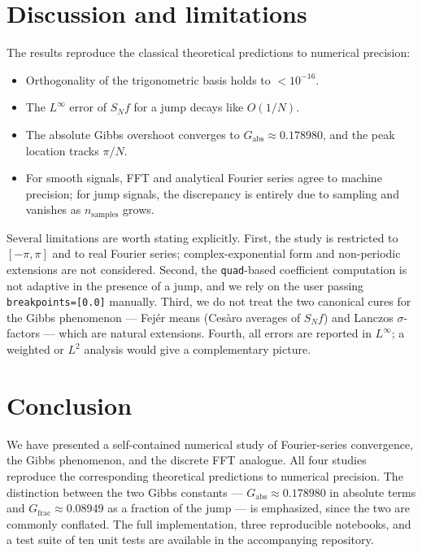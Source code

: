 \documentclass[11pt,a4paper]{article}
\begin{document}
\section{Discussion and limitations}
\label{sec:discussion}

The results reproduce the classical theoretical predictions to numerical
precision:

\begin{itemize}
    \item Orthogonality of the trigonometric basis holds to
          $<10^{-16}$.
    \item The $L^\infty$ error of $S_N f$ for a jump decays like
          $O(1/N)$.
    \item The absolute Gibbs overshoot converges to
          $G_{\text{abs}} \approx 0.178980$, and the peak location tracks
          $\pi/N$.
    \item For smooth signals, FFT and analytical Fourier series agree to
          machine precision; for jump signals, the discrepancy is entirely
          due to sampling and vanishes as $n_{\text{samples}}$ grows.
\end{itemize}

Several limitations are worth stating explicitly. First, the study is
restricted to $[-\pi, \pi]$ and to real Fourier series; complex-exponential
form and non-periodic extensions are not considered. Second, the
\texttt{quad}-based coefficient computation is not adaptive in the presence
of a jump, and we rely on the user passing \texttt{breakpoints=[0.0]}
manually. Third, we do not treat the two canonical cures for the Gibbs
phenomenon --- Fej\'er means (Ces\`aro averages of $S_N f$) and Lanczos
$\sigma$-factors --- which are natural extensions. Fourth, all errors are
reported in $L^\infty$; a weighted or $L^2$ analysis would give a
complementary picture.

\section{Conclusion}
\label{sec:conclusion}

We have presented a self-contained numerical study of Fourier-series
convergence, the Gibbs phenomenon, and the discrete FFT analogue. All four
studies reproduce the corresponding theoretical predictions to numerical
precision. The distinction between the two Gibbs constants ---
$G_{\text{abs}} \approx 0.178980$ in absolute terms and
$G_{\text{frac}} \approx 0.08949$ as a fraction of the jump --- is
emphasized, since the two are commonly conflated. The full implementation,
three reproducible notebooks, and a test suite of ten unit tests are
available in the accompanying repository.
\end{document}
